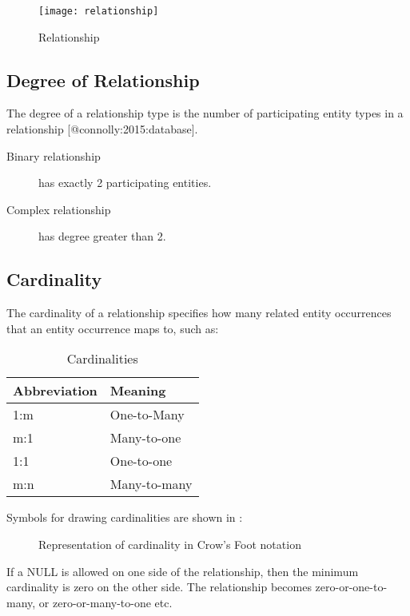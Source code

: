 \documentclass[slides]{pgnotes}
\begin{document}
\begin{figure}[htbp]
\centering
\texttt{[image: relationship]}
\caption{Relationship}
\end{figure}

\subsection{Degree of Relationship}
\label{degree-of-relationship}

The degree of a relationship type is the number of participating entity
types in a relationship {[}@connolly:2015:database{]}.

\begin{description}
\item[Binary relationship]
has exactly 2 participating entities.
\item[Complex relationship]
has degree greater than 2.
\end{description}

\subsection{Cardinality}
\label{cardinality}

The cardinality of a relationship specifies how many related entity
occurrences that an entity occurrence maps to, such as:

\begin{table}[htbp]
  \centering
  \begin{tabular}{l l}
    \toprule
    \textbf{Abbreviation} & \textbf{Meaning}\\
    \midrule
    1:m & One-to-Many\\
    m:1 & Many-to-one\\
    1:1 & One-to-one\\
    m:n & Many-to-many\\
    \bottomrule
  \end{tabular}
  \caption{Cardinalities}
  \label{tab:cardinalities}
\end{table}

\newpage

Symbols for drawing cardinalities are shown in :

\begin{figure}[htbp]
\centering
\caption{Representation of cardinality in Crow's Foot notation{}}
\end{figure}

If a NULL is allowed on one side of the relationship, then the minimum
cardinality is zero on the other side. The relationship becomes
zero-or-one-to-many, or zero-or-many-to-one etc.
\end{document}
